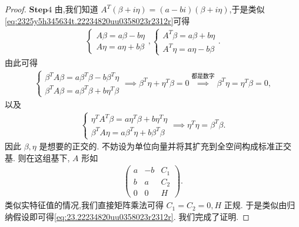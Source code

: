 \documentclass[../../main.tex]{subfiles}%
\begin{document}
\begin{proof}
$\mathbf{Step}4$  由,我们知道 $A^T(\beta + i\eta) = (a - bi)(\beta + i\eta)$,于是类似\eqref{eq:2325y5h345634t.22234820uu0358023r2312r}可得
\begin{align*}
\begin{cases} 
A\beta = a\beta - b\eta \\
A\eta = a\eta + b\beta 
\end{cases},
\begin{cases} 
A^T\beta = a\beta + b\eta \\
A^T\eta = a\eta - b\beta 
\end{cases}.
\end{align*}
由此可得
\begin{align*}
\begin{cases} 
\beta^TA\beta = a\beta^T\beta - b\beta^T\eta \\
\beta^TA\beta = a\beta^T\beta + b\eta^T\beta 
\end{cases}
\implies \beta^T\eta + \eta^T\beta = 0 \stackrel{\text{都是数字}}{\implies} \beta^T\eta = \eta^T\beta = 0,
\end{align*}
以及
\begin{align*}
\begin{cases} 
\eta^TA^T\beta = a\eta^T\beta + b\eta^T\eta \\
\beta^TA\eta = a\beta^T\eta + b\beta^T\beta 
\end{cases}
\implies \eta^T\eta = \beta^T\beta.
\end{align*}
因此 $\beta,\eta$ 是想要的正交的. 不妨设为单位向量并将其扩充到全空间构成标准正交基. 则在这组基下, $A$ 形如
\begin{align*}
\begin{pmatrix} a & -b & C_1 \\ b & a & C_2 \\ 0 & 0 & H \end{pmatrix}.
\end{align*}
类似实特征值的情况,我们直接矩阵乘法可得 $C_1 = C_2 = 0, H$ 正规. 于是类似由归纳假设即可得\eqref{eq:23.22234820uu0358023r2312r}. 我们完成了证明.
\end{proof}
\end{document}
